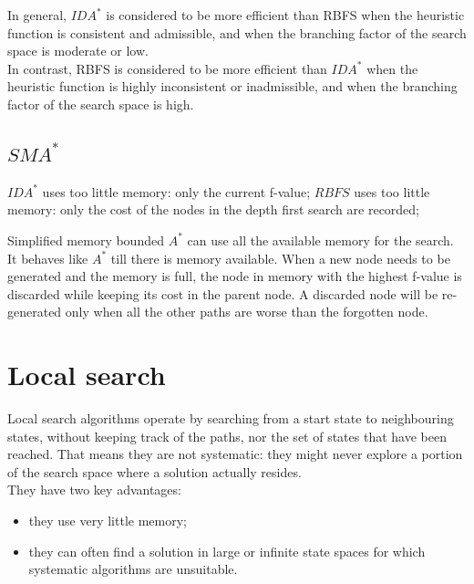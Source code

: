 \documentclass{article}
\begin{document}
In general, $IDA^*$ is considered to be more efficient than RBFS when the heuristic function is consistent and admissible, and when the branching factor of the search space is moderate or low. \\

In contrast, RBFS is considered to be more efficient than $IDA^*$ when the heuristic function is highly inconsistent or inadmissible, and when the branching factor of the search space is high.

\subsection{$SMA^*$}

\begin{center}
    $IDA^*$ uses too little memory: only the current f-value;
    $RBFS$ uses too little memory: only the cost of the nodes in the depth first search are recorded;
\end{center}

Simplified memory bounded $A^*$ can use all the available memory for the search. It behaves like $A^*$ till there is memory available. When a new node needs to be generated and the memory is full, the node in memory with the highest f-value is discarded while keeping its cost in the parent node. A discarded node will be re-generated only when all the other paths are worse than the forgotten node.

\newpage

\section{Local search}

Local search algorithms operate by searching from a start state to neighbouring states, without keeping track of the paths, nor the set of states that have been reached. That means they are not systematic: they might never explore a portion of the search space where a solution actually resides. \\

They have two key advantages:

\begin{itemize}
    \item they use very little memory;
    \item they can often find a solution in large or infinite state spaces for which systematic algorithms are unsuitable.
\end{itemize}
\end{document}
